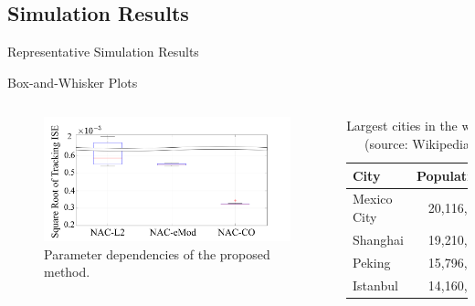 \documentclass[8pt, aspectratio=169]{beamer}
\begin{document}
\subsection{Simulation Results}

\begin{frame}{Representative Simulation Results}




\end{frame}

\begin{frame}{Box-and-Whisker Plots}
  
  \begin{columns}
      \begin{figure}
        \includegraphics[width=\textwidth]{figures/BoxWhisker.drawio.png}
        \caption{Parameter dependencies of the proposed method.}
      \end{figure}

      \begin{table}
        \caption{Largest cities in the world (source: Wikipedia)}
        \begin{tabular}{@{} lr @{}}
          \toprule
          City & Population\\
          \midrule
          Mexico City & 20,116,842\\
          Shanghai & 19,210,000\\
          Peking & 15,796,450\\
          Istanbul & 14,160,467\\
          \bottomrule
        \end{tabular}
    \end{table}
    
  \end{columns}

\end{frame}
\end{document}
